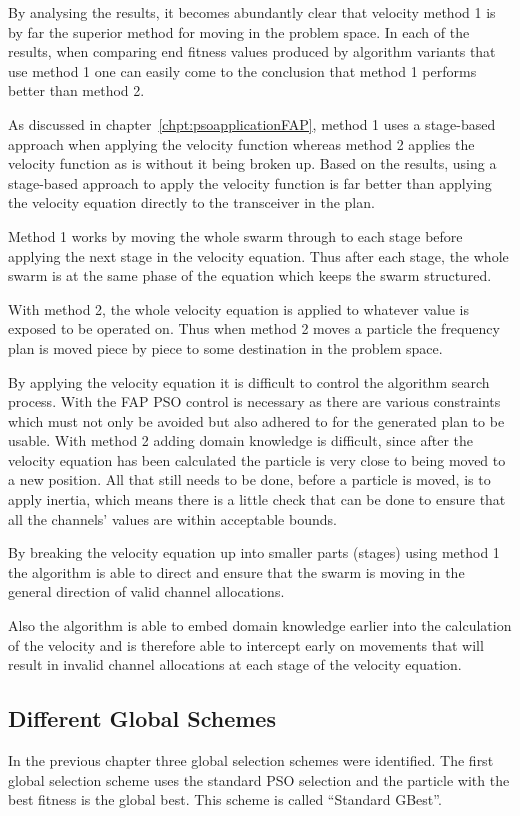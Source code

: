 By analysing the results, it becomes abundantly clear that velocity method 1 is by far the superior method for moving in the problem space. In each of the results, when comparing end fitness values produced by algorithm variants that use method 1 one can easily come to the conclusion that method 1 performs better than method 2.

As discussed in chapter~\ref{chpt:psoapplicationFAP}, method 1 uses a stage-based approach when applying the velocity function whereas method 2 applies the velocity function as is without it being broken up. Based on the results, using a stage-based approach to apply the velocity function is far better than applying the velocity equation directly to the transceiver in the plan.

Method 1 works by moving the whole swarm through to each stage before applying the next stage in the velocity equation. Thus after each stage, the whole swarm is at the same phase of the equation which keeps the swarm structured.

With method 2, the whole velocity equation is applied to whatever value is exposed to be operated on. Thus when method 2 moves a particle the frequency plan is moved piece by piece to some destination in the problem space.

By applying the velocity equation it is difficult to control the algorithm search process. With the FAP PSO control is necessary as there are various constraints which must not only be avoided but also adhered to for the generated plan to be usable. With method 2 adding domain knowledge is difficult, since after the velocity equation has been calculated the particle is very close to being moved to a new position. All that still needs to be done, before a particle is moved, is to apply inertia, which means there is a little check that can be done to ensure that all the channels' values are within acceptable bounds.

By breaking the velocity equation up into smaller parts (stages) using method 1 the algorithm is able to direct and ensure that the swarm is moving in the general direction of valid channel allocations.

Also the algorithm is able to embed domain knowledge earlier into the calculation of the velocity and is therefore able to intercept early on movements that will result in invalid channel allocations at each stage of the velocity equation.

\subsection{Different Global Schemes}
\label{sec:diffglobalschemes}
In the previous chapter three global selection schemes were identified. The first global selection scheme uses the standard PSO selection and the particle with the best fitness is the global best. This scheme is called ``Standard GBest''.

